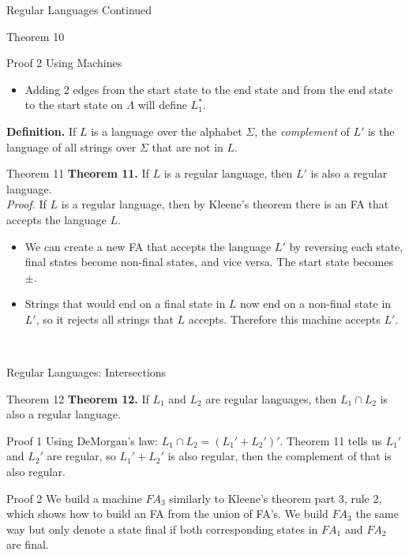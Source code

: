 \documentclass{article}
\begin{document}
\begin{multicols*}{3}
\begin{blackbox}{Regular Languages Continued}
\begin{brownbox}{Theorem 10}
\begin{redbox}{Proof 2 Using Machines}
\begin{itemize}[leftmargin=5pt]
                \item Adding 2 edges from the start state to the end state and from the end state to the start state on $\Lambda$ will define $L_1^*$.
            \end{itemize}
            \end{redbox}
    \end{brownbox}
    \textbf{Definition.} If $L$ is a language over the alphabet $\Sigma$, the \emph{complement} of $L'$ is the language of all strings over $\Sigma$ that are not in $L$.\\[1.5ex]
    \begin{bluebox}{Theorem 11}
        \textbf{Theorem 11.} If $L$ is a regular language, then $L'$ is also a regular language.\\[1ex]
        \textit{Proof.} If $L$ is a regular language, then by Kleene's theorem there is an FA that accepts the language $L$.
        \begin{itemize}[leftmargin=5pt]
            \item We can create a new FA that accepts the language $L'$ by reversing each state, final states become non-final states, and vice versa. The start state becomes $\pm$.
            \item Strings that would end on a final state in $L$ now end on a non-final state in $L'$, so it rejects all strings that $L$ accepts. Therefore this machine accepts $L'$.
        \end{itemize}
    \end{bluebox}\\[-2ex]
\end{blackbox}
\begin{blackbox}{Regular Languages: Intersections}
    \begin{redbox}{Theorem 12}
        \textbf{Theorem 12.} If $L_1$ and $L_2$ are regular languages, then $L_1\cap L_2$ is also a regular language.\\[1ex]
        \begin{brownbox}{Proof 1}
            Using DeMorgan's law: $L_1 \cap L_2 = (L_1' + L_2')'$. Theorem 11 tells us $L_1'$ and $L_2'$ are regular, so $L_1' + L_2'$ is also regular, then the complement of that is also regular.
        \end{brownbox}
        \begin{pinkbox}{Proof 2}
            We build a machine $FA_3$ similarly to Kleene's theorem part 3, rule 2, which shows how to build an FA from the union of FA's. We build $FA_3$ the same way but only denote a state final if both corresponding states in $FA_1$ and $FA_2$ are final.

\end{pinkbox}
\end{redbox}
\end{blackbox}
\end{multicols*}
\end{document}
